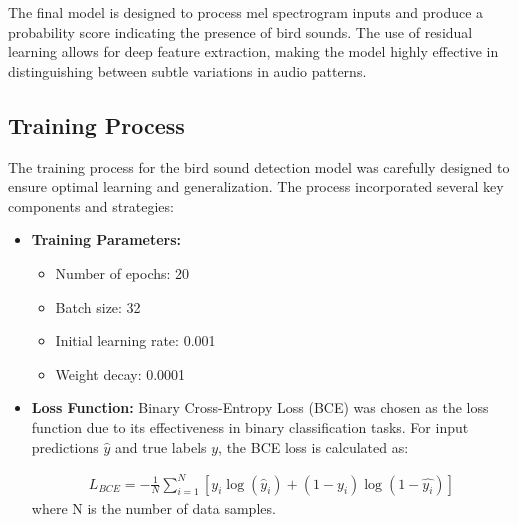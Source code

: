       The final model is designed to process mel spectrogram inputs and produce a probability score indicating the presence of bird sounds. The use of residual learning allows for deep feature extraction, making the model highly effective in distinguishing between subtle variations in audio patterns.
      
      

      \subsection{Training Process}
      The training process for the bird sound detection model was carefully designed to ensure optimal learning and generalization. The process incorporated several key components and strategies:
      \begin{itemize}
            \\
            \item \textbf{Training Parameters:}
            \begin{itemize}
                  \item Number of epochs: 20
                  \item Batch size: 32
                  \item Initial learning rate: 0.001
                  \item Weight decay: 0.0001
            \end{itemize}

            \item \textbf{Loss Function:}
            Binary Cross-Entropy Loss (BCE) was chosen as the loss function due to its effectiveness in binary classification tasks. For input predictions $\hat{y}$ and true labels $y$, the BCE loss is calculated as:
            
            
            \begin{eqnarray}
                  L_{BCE} = -\frac{1}{N}\sum_{i=1}^{N}[y_i\log(\hat{y}_i) + (1-y_i)\log(1-\hat{y_i})]
            \end{eqnarray}
                  where N is the number of data samples.


\end{itemize}
